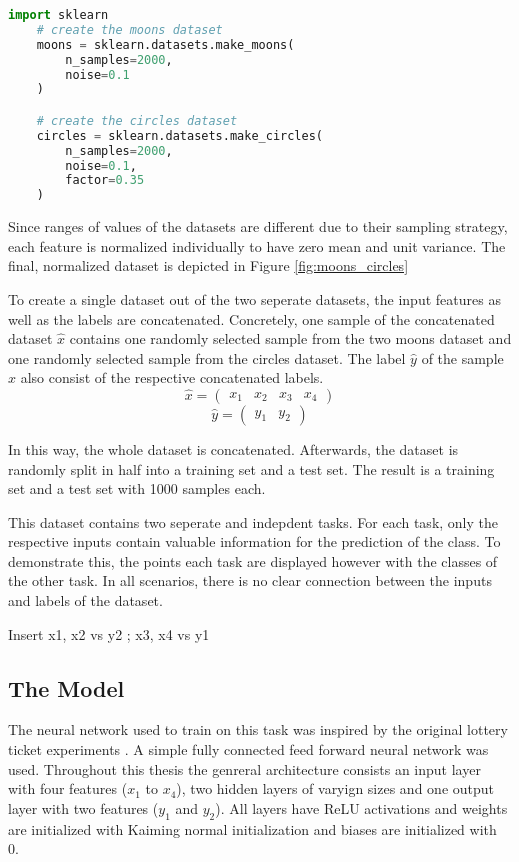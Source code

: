 \begin{lstlisting}[language=Python]
    import sklearn
    # create the moons dataset
    moons = sklearn.datasets.make_moons(
        n_samples=2000, 
        noise=0.1
    )

    # create the circles dataset
    circles = sklearn.datasets.make_circles(
        n_samples=2000, 
        noise=0.1, 
        factor=0.35
    )
\end{lstlisting}

Since ranges of values of the datasets are different due to their sampling strategy, each feature is normalized individually to have zero mean and unit variance.
The final, normalized dataset is depicted in Figure \ref{fig:moons_circles}

To create a single dataset out of the two seperate datasets, the input features as well as the labels are concatenated.
Concretely, one sample of the concatenated dataset $\hat x$ contains one randomly selected sample from the two moons dataset and one randomly selected sample from the circles dataset.
The label $\hat y$ of the sample $\hat x$ also consist of the respective concatenated labels.
$$\hat x = \begin{pmatrix} x_1 & x_2 & x_3 & x_4 \end{pmatrix}$$
$$\hat y = \begin{pmatrix} y_1 & y_2 \end{pmatrix}$$

In this way, the whole dataset is concatenated.
Afterwards, the dataset is randomly split in half into a training set and a test set.
The result is a training set and a test set with 1000 samples each.

This dataset contains two seperate and indepdent tasks.
For each task, only the respective inputs contain valuable information for the prediction of the class.
To demonstrate this, the points each task are displayed however with the classes of the other task.
In all scenarios, there is no clear connection between the inputs and labels of the dataset.

Insert x1, x2 vs y2 ; x3, x4 vs y1

\subsection{The Model}
The neural network used to train on this task was inspired by the original lottery ticket experiments \autocite{DBLP:conf/iclr/FrankleC19}. A simple fully connected feed forward neural network was used.
Throughout this thesis the genreral architecture consists an input layer with four features ($x_1$ to $x_4$), two hidden layers of varyign sizes and one output layer with two features ($y_1$ and $y_2$).
All layers have ReLU activations and weights are initialized with Kaiming normal initialization \autocite{Kaiming} and biases are initialized with 0.

